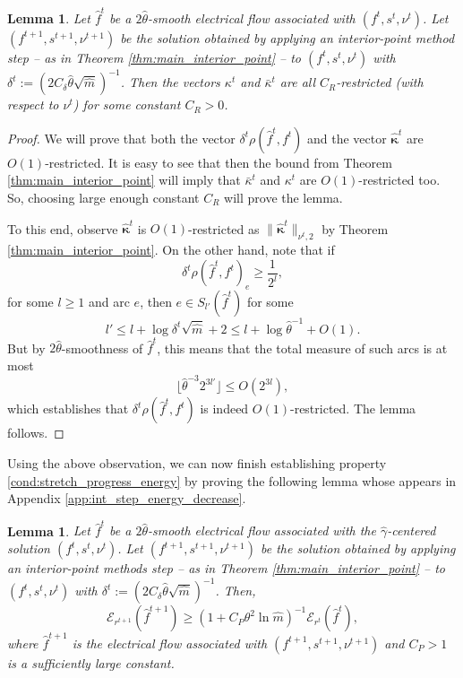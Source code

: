 \documentclass[11pt, letterpaper]{article}
\newtheorem{lemma}[theorem]{Lemma}
\newcommand{\cdelta}{C_{\delta}}
\newcommand{\cendecrease}{C_{P}}
\newcommand{\crestrict}{C_{R}}
\newcommand{\floor}[1]{\lfloor #1 \rfloor}
\newcommand{\norm}[2]{\|#1\|_{#2}}
\newcommand{\hm}{\widehat{m}}
\newcommand{\energy}[2]{\mathcal{E}_{#1}(#2)}
\newcommand{\Cset}[2]{S_{#1}(#2)}
\newcommand{\hgamma}{\hat{\gamma}}
\newcommand{\htheta}{\hat{\theta}}
\newcommand{\okappa}{\bar{\kappa}}
\newcommand{\vrho}{\boldsymbol{\mathit{\rho}}}
\newcommand{\vnu}{\boldsymbol{\mathit{\nu}}}
\newcommand{\vkappa}{\boldsymbol{\mathit{{\kappa}}}}
\newcommand{\ovkappa}{\boldsymbol{\mathit{\bar{\kappa}}}}
\newcommand{\hvkappa}{\boldsymbol{\hat{\kappa}}}
\newcommand{\ff}{\boldsymbol{\mathit{f}}}
\newcommand{\hff}{\boldsymbol{\mathit{\hat{f}}}}
\newcommand{\rr}{\boldsymbol{\mathit{r}}}
\renewcommand{\ss}{\boldsymbol{\mathit{s}}}
\begin{document}
\begin{lemma}
\label{lem:bounding_smooth}
Let $\hff^t$ be a $2\htheta$-smooth electrical flow associated with $(\ff^t,\ss^t,\vnu^t)$. Let $(\ff^{t+1},\ss^{t+1},\vnu^{t+1})$ be the solution obtained by applying an interior-point method step -- as in Theorem \ref{thm:main_interior_point} -- to $(\ff^t,\ss^t,\vnu^t)$ with $\delta^t:=(2\cdelta\htheta\sqrt{\hm})^{-1}$. Then the vectors $\vkappa^t$ and $\okappa^t$ are all $\crestrict$-restricted (with respect to $\vnu^t$) for some constant $\crestrict>0$.
\end{lemma}


\begin{proof}
We will prove that both the vector $\delta^t\vrho(\hff^t,\ff^t)$ and the vector $\hvkappa^t$ are $O(1)$-restricted. It is easy to see that then the bound from Theorem \ref{thm:main_interior_point} will imply that $\ovkappa^t$ and $\vkappa^t$ are $O(1)$-restricted too. So, choosing large enough constant $\crestrict$ will prove the lemma.

To this end, observe $\hvkappa^t$ is $O(1)$-restricted as $\norm{\hvkappa^t}{\vnu^t,2}$ by Theorem \ref{thm:main_interior_point}. On the other hand, note that if
\[
\delta^t\rho(\hff^t,\ff^t)_e \geq \frac{1}{2^{l}},
\]
 for some $l\geq 1$ and arc $e$, then $e\in \Cset{l'}{\hff^t}$ for some 
 \[
 l'\leq l+\log \delta^t\sqrt{\hm}+2 \leq l+ \log \htheta^{-1} + O(1).
\]
But by $2\htheta$-smoothness of $\hff^t$, this means that the total measure of such arcs is at most
\[
\floor{\htheta^{-3}2^{3l'}} \leq O(2^{3l}),
\]
which establishes that $\delta^t \vrho(\hff^t,\ff^t)$ is indeed $O(1)$-restricted. The lemma follows.
\end{proof}

Using the above observation, we can now finish establishing property \eqref{cond:stretch_progress_energy} by proving the following lemma whose appears in Appendix \ref{app:int_step_energy_decrease}.
\begin{lemma}
\label{lem:int_step_energy_decrease}
Let $\hff^t$ be a $2\htheta$-smooth electrical flow associated with the $\hgamma$-centered solution $(\ff^t,\ss^t,\vnu^t)$. Let $(\ff^{t+1},\ss^{t+1},\vnu^{t+1})$ be the solution obtained by applying an interior-point methods step -- as in Theorem \ref{thm:main_interior_point} -- to $(\ff^t,\ss^t,\vnu^t)$ with $\delta^t:=(2\cdelta \htheta \sqrt{\hm})^{-1}$. Then, 
\[
\energy{\rr^{t+1}}{\hff^{t+1}}\geq (1+\cendecrease\theta^2 \ln \hm)^{-1}\energy{\rr^t}{\hff^t},
\]
where $\hff^{t+1}$ is the electrical flow associated with $(\ff^{t+1},\ss^{t+1},\vnu^{t+1})$ and $\cendecrease>1$ is a sufficiently large constant. 
\end{lemma}
\end{document}
